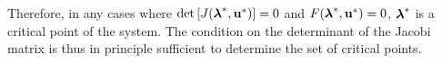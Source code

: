 \documentclass[
11pt, %
english, %
singlespacing, %
liststotoc, %
headsepline, %
]{MastersDoctoralThesis} %
\begin{document}
Therefore, in any cases where $\det\left[ J(\boldsymbol{\mathrm{\lambda}}^*, \boldsymbol{\mathrm{u}}^*) \right] = 0$ and $F(\boldsymbol{\mathrm{\lambda}}^*, \boldsymbol{\mathrm{u}}^*) = 0$, $\boldsymbol{\mathrm{\lambda}}^*$ is a critical point of the system. The condition on the determinant of the Jacobi matrix is thus in principle sufficient to determine the set of critical points.


\appendix %



\printbibliography[heading=bibintoc]

\end{document}
